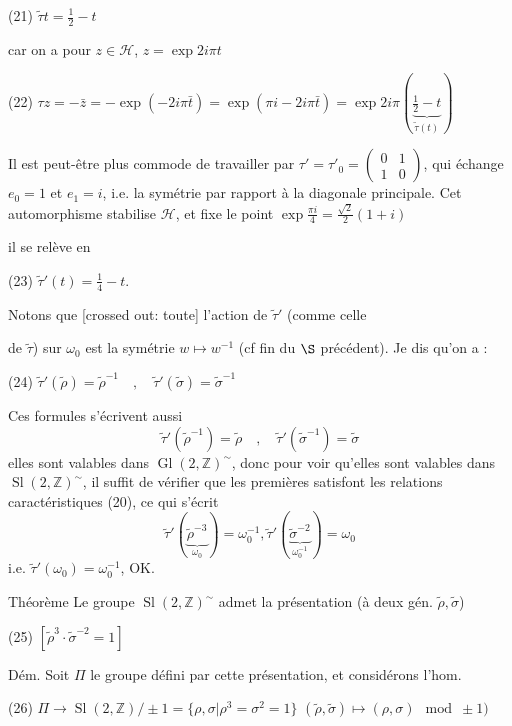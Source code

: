 (21) $\tilde{\tau}t = \frac{1}{2} - t$

car on a pour $z \in \mathcal{H}$, $z = \exp 2i\pi t$

(22) $\tau z = -\bar{z} = -\exp(-2i\pi \bar{t}) = \exp(\pi i - 2i\pi \bar{t}) = \exp 2i\pi(\underbrace{\frac{1}{2}-t}_{\tilde{\tau}(t)})$

Il est peut-être plus commode de travailler par $\tau' = \tau'_0 = \begin{pmatrix} 0 & 1 \\ 1 & 0 \end{pmatrix}$, qui échange $e_0 = 1$ et $e_1 = i$, i.e. la symétrie par rapport à la diagonale principale. Cet automorphisme stabilise $\mathcal{H}$, et fixe le point $\exp \frac{\pi i}{4} = \frac{\sqrt{2}}{2}(1+i)$

il se relève en

(23) $\tilde{\tau}'(t) = \frac{1}{4} - t$.

Notons que [crossed out: toute] l'action de $\tilde{\tau}'$ (comme celle

\newpage


de $\tilde{\tau}$) sur $\omega_0$ est la symétrie $w \mapsto w^{-1}$
(cf fin du $\S$ précédent). Je dis qu'on a :

(24) $\tilde{\tau}'(\tilde{\rho}) = \tilde{\rho}^{-1} \quad , \quad \tilde{\tau}'(\tilde{\sigma}) = \tilde{\sigma}^{-1}$

Ces formules s'écrivent aussi
$$\tilde{\tau}'(\tilde{\rho}^{-1}) = \tilde{\rho} \quad , \quad \tilde{\tau}'(\tilde{\sigma}^{-1}) = \tilde{\sigma}$$
elles sont valables dans $\operatorname{Gl}(2,\mathbb{Z})^\sim$, donc
pour voir qu'elles sont valables dans $\operatorname{Sl}(2,\mathbb{Z})^\sim$,
il suffit de vérifier que les premières
satisfont les relations caractéristiques
(20), ce qui s'écrit
$$\tilde{\tau}'( \underbrace{\tilde{\rho}^{-3}}_{\omega_0} ) = \omega_0^{-1} , \tilde{\tau}'( \underbrace{\tilde{\sigma}^{-2}}_{\omega_0^{-1}} ) = \omega_0$$
i.e. $\tilde{\tau}'(\omega_0) = \omega_0^{-1}$, OK.

Théorème Le groupe $\operatorname{Sl}(2,\mathbb{Z})^\sim$ admet
la présentation (à deux gén. $\tilde{\rho},\tilde{\sigma}$)

(25) $[ \tilde{\rho}^3 \cdot \tilde{\sigma}^{-2} = 1 ]$

Dém. Soit $\Pi$ le groupe défini
par cette présentation, et considérons
l'hom.

(26) $\Pi \to \operatorname{Sl}(2,\mathbb{Z})/\pm 1 = \{ \rho, \sigma | \rho^3 = \sigma^2 = 1 \}$
$(\tilde{\rho},\tilde{\sigma}) \mapsto (\rho,\sigma) \mod \pm 1)$

